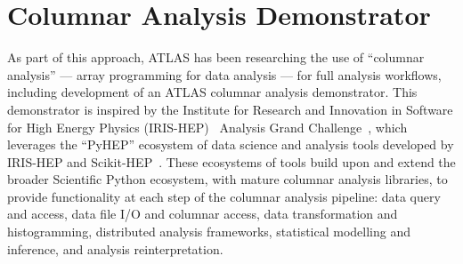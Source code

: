 \section{Columnar Analysis Demonstrator}\label{sec:demonstrator}



As part of this approach, ATLAS has been researching the use of ``columnar analysis'' --- array programming for data analysis --- for full analysis workflows, including development of an ATLAS columnar analysis demonstrator.
This demonstrator is inspired by the Institute for Research and Innovation in Software for High Energy Physics (IRIS-HEP)~\cite{S2I2HEPSP,CWPDOC} Analysis Grand Challenge~\cite{Held:2022sfw}, which leverages the ``PyHEP'' ecosystem of data science and analysis tools developed by IRIS-HEP and Scikit-HEP~\cite{Rodrigues:2020syo}.
These ecosystems of tools build upon and extend the broader Scientific Python ecosystem, with mature columnar analysis libraries, to provide functionality at each step of the columnar analysis pipeline: data query and access, data file I/O and columnar access, data transformation and histogramming, distributed analysis frameworks, statistical modelling and inference, and analysis reinterpretation.

